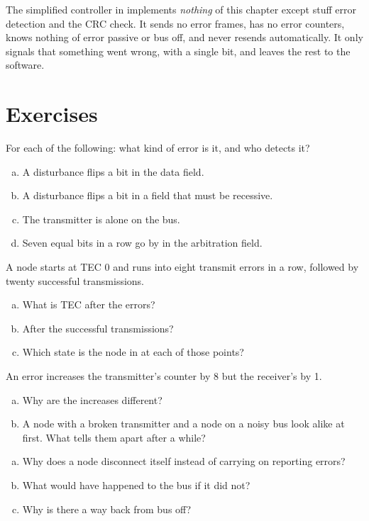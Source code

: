 \begin{simplification}
\note[Simplification] The simplified controller in  implements \emph{nothing} of
this chapter except stuff error detection and the CRC check. It sends no error frames, has no error
counters, knows nothing of error passive or bus off, and never resends automatically. It only
signals that something went wrong, with a single bit, and leaves the rest to the software.
\end{simplification}

\section*{Exercises}

\label{ex:6:1}
For each of the following: what kind of error is it, and who detects it?
\begin{enumerate}[a)]
  \item A disturbance flips a bit in the data field.
  \item A disturbance flips a bit in a field that must be recessive.
  \item The transmitter is alone on the bus.
  \item Seven equal bits in a row go by in the arbitration field.
\end{enumerate}

\label{ex:6:2}
A node starts at TEC 0 and runs into eight transmit errors in a row, followed by twenty successful
transmissions.
\begin{enumerate}[a)]
  \item What is TEC after the errors?
  \item After the successful transmissions?
  \item Which state is the node in at each of those points?
\end{enumerate}

\label{ex:6:3}
An error increases the transmitter's counter by 8 but the receiver's by 1.
\begin{enumerate}[a)]
  \item Why are the increases different?
  \item A node with a broken transmitter and a node on a noisy bus look alike at first. What tells
    them apart after a while?
\end{enumerate}

\label{ex:6:4}
\begin{enumerate}[a)]
  \item Why does a node disconnect itself instead of carrying on reporting errors?
  \item What would have happened to the bus if it did not?
  \item Why is there a way back from bus off?
\end{enumerate}
